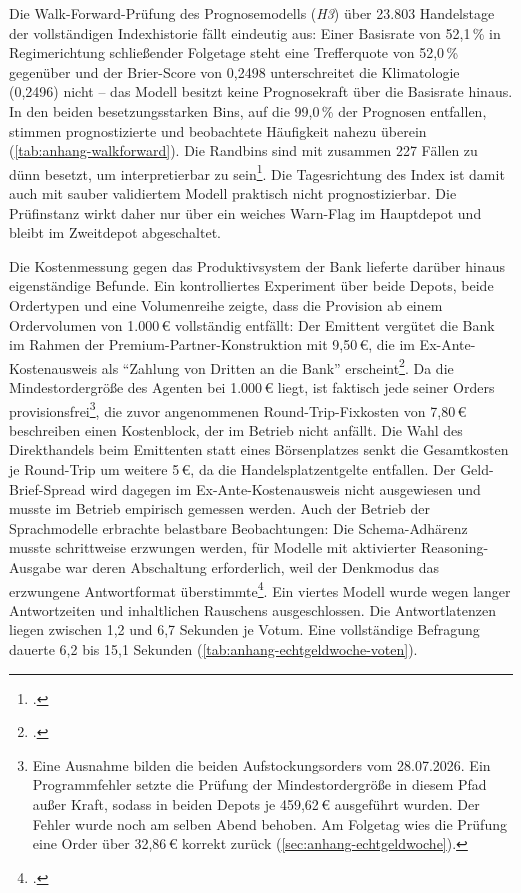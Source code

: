 Die Walk-Forward-Prüfung des Prognosemodells (\emph{H3}) über 23.803 Handelstage der
vollständigen Indexhistorie fällt eindeutig aus: Einer Basisrate von 52,1\,\% in Regimerichtung
schließender Folgetage steht eine Trefferquote von 52,0\,\% gegenüber und der Brier-Score
von 0,2498 unterschreitet die Klimatologie (0,2496) nicht -- das Modell besitzt keine
Prognosekraft über die Basisrate hinaus. In den beiden besetzungsstarken Bins, auf die
99,0\,\% der Prognosen entfallen, stimmen prognostizierte und beobachtete Häufigkeit nahezu
überein (\cref{tab:anhang-walkforward}). Die Randbins sind mit zusammen 227 Fällen zu dünn
besetzt, um interpretierbar zu sein\footcites[zur Zerlegung des Brier-Scores in
Kalibrierungs- und Auflösungsanteil vgl.][S.~595--600]{murphy1973}[zur Bewertung
kalibrierter Wahrscheinlichkeiten vgl.][S.~625--632]{niculescuMizil2005}. Die Tagesrichtung des Index ist damit auch mit sauber validiertem Modell praktisch nicht prognostizierbar. Die
Prüfinstanz wirkt daher nur über ein weiches Warn-Flag im Hauptdepot und bleibt im
Zweitdepot abgeschaltet.

Die Kostenmessung gegen das Produktivsystem der Bank lieferte darüber hinaus eigenständige
Befunde. Ein kontrolliertes Experiment über beide Depots, beide Ordertypen und eine
Volumenreihe zeigte, dass die Provision ab einem Ordervolumen von 1.000\,€ vollständig
entfällt: Der Emittent vergütet die Bank im Rahmen der Premium-Partner-Konstruktion mit
9{,}50\,€, die im Ex-Ante-Kostenausweis als \enquote{Zahlung von Dritten an die Bank}
erscheint\footcites[vgl.][Art.~24 Abs.~9]{mifid2014}[vgl.][Art.~50]{delvo2017}. Da die Mindestordergröße des Agenten bei 1.000\,€ liegt, ist faktisch
jede seiner Orders provisionsfrei\footnote{Eine Ausnahme bilden die beiden
Aufstockungsorders vom 28.07.2026. Ein Programmfehler setzte die Prüfung der
Mindestordergröße in diesem Pfad außer Kraft, sodass in beiden Depots je 459{,}62\,€
ausgeführt wurden. Der Fehler wurde noch am selben Abend behoben. Am Folgetag wies die
Prüfung eine Order über 32{,}86\,€ korrekt zurück
(\cref{sec:anhang-echtgeldwoche}).}, die zuvor angenommenen Round-Trip-Fixkosten von 7{,}80\,€
beschreiben einen Kostenblock, der im Betrieb nicht anfällt. Die Wahl des Direkthandels beim
Emittenten statt eines Börsenplatzes senkt die Gesamtkosten je Round-Trip um weitere 5\,€,
da die Handelsplatzentgelte entfallen. Der Geld-Brief-Spread wird dagegen im
Ex-Ante-Kostenausweis nicht ausgewiesen und musste im Betrieb empirisch gemessen werden.
Auch der Betrieb der Sprachmodelle erbrachte belastbare Beobachtungen: Die Schema-Adhärenz
musste schrittweise erzwungen werden, für Modelle mit aktivierter Reasoning-Ausgabe war
deren Abschaltung erforderlich, weil der Denkmodus das erzwungene Antwortformat
überstimmte\footcite[vgl.][S.~24824--24837]{wei2022}.
Ein viertes Modell wurde wegen langer Antwortzeiten und inhaltlichen Rauschens
ausgeschlossen. Die Antwortlatenzen liegen zwischen 1,2 und 6,7 Sekunden je Votum. Eine
vollständige Befragung dauerte 6,2 bis 15,1 Sekunden
(\cref{tab:anhang-echtgeldwoche-voten}).

